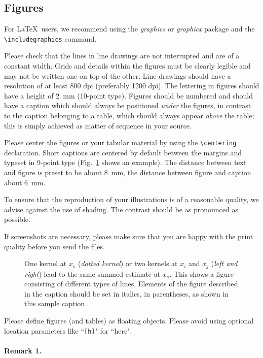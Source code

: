 \documentclass[runningheads,a4paper]{llncs}
\begin{document}
\subsection{Figures}

For \LaTeX\ users, we recommend using the \emph{graphics} or \emph{graphicx}
package and the \verb+\includegraphics+ command.

Please check that the lines in line drawings are not
interrupted and are of a constant width. Grids and details within the
figures must be clearly legible and may not be written one on top of
the other. Line drawings should have a resolution of at least 800 dpi
(preferably 1200 dpi). The lettering in figures should have a height of
2~mm (10-point type). Figures should be numbered and should have a
caption which should always be positioned \emph{under} the figures, in
contrast to the caption belonging to a table, which should always appear
\emph{above} the table; this is simply achieved as matter of sequence in
your source.

Please center the figures or your tabular material by using the \verb+\centering+
declaration. Short captions are centered by default between the margins
and typeset in 9-point type (Fig.~\ref{fig:example} shows an example).
The distance between text and figure is preset to be about 8~mm, the
distance between figure and caption about 6~mm.

To ensure that the reproduction of your illustrations is of a reasonable
quality, we advise against the use of shading. The contrast should be as
pronounced as possible.

If screenshots are necessary, please make sure that you are happy with
the print quality before you send the files.
\begin{figure}
\centering
\caption{One kernel at $x_s$ (\emph{dotted kernel}) or two kernels at
$x_i$ and $x_j$ (\textit{left and right}) lead to the same summed estimate
at $x_s$. This shows a figure consisting of different types of
lines. Elements of the figure described in the caption should be set in
italics, in parentheses, as shown in this sample caption.}
\label{fig:example}
\end{figure}

Please define figures (and tables) as floating objects. Please avoid
using optional location parameters like ``\verb+[h]+" for ``here".

\paragraph{Remark 1.}
\end{document}

